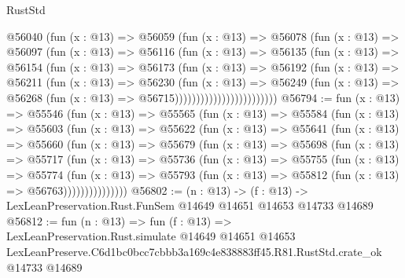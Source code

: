 \begin{lexlean}{RustStd}
\begin{coremodule}
                        @56040
                          (fun (x : @13) =>
                          @56059
                            (fun (x : @13) =>
                            @56078
                              (fun (x : @13) =>
                              @56097
                                (fun (x : @13) =>
                                @56116
                                  (fun (x : @13) =>
                                  @56135
                                    (fun (x : @13) =>
                                    @56154
                                      (fun (x : @13) =>
                                      @56173
                                        (fun (x : @13) =>
                                        @56192
                                          (fun (x : @13) =>
                                          @56211
                                            (fun (x : @13) =>
                                            @56230
                                              (fun (x : @13) =>
                                              @56249
                                                (fun (x : @13) =>
                                                @56268
                                                  (fun (x : @13) => @56715))))))))))))))))))))))))
@56794 := fun (x : @13) =>
  @55546
    (fun (x : @13) =>
    @55565
      (fun (x : @13) =>
      @55584
        (fun (x : @13) =>
        @55603
          (fun (x : @13) =>
          @55622
            (fun (x : @13) =>
            @55641
              (fun (x : @13) =>
              @55660
                (fun (x : @13) =>
                @55679
                  (fun (x : @13) =>
                  @55698
                    (fun (x : @13) =>
                    @55717
                      (fun (x : @13) =>
                      @55736
                        (fun (x : @13) =>
                        @55755
                          (fun (x : @13) =>
                          @55774
                            (fun (x : @13) =>
                            @55793 (fun (x : @13) => @55812 (fun (x : @13) => @56763)))))))))))))))
@56802 := (n : @13) ->
  (f : @13) -> LexLeanPreservation.Rust.FunSem @14649 @14651 @14653 @14733 @14689
@56812 := fun (n : @13) =>
  fun (f : @13) =>
  LexLeanPreservation.Rust.simulate
    @14649
    @14651
    @14653
    LexLeanPreserve.C6d1bc0bcc7cbbb3a169c4e838883ff45.R81.RustStd.crate_ok
    @14733
    @14689
\end{coremodule}
\end{lexlean}
